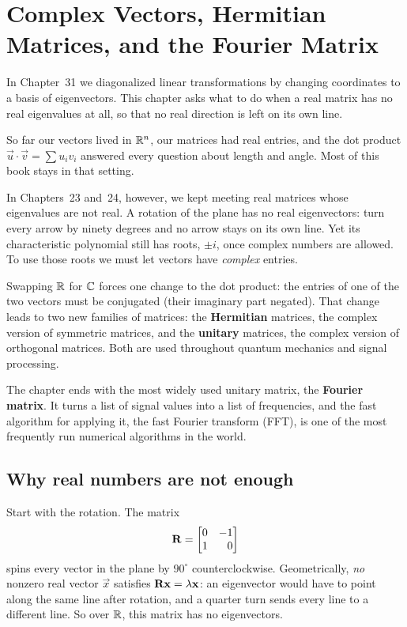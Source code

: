 \chapter{Complex Vectors, Hermitian Matrices, and the Fourier Matrix}

In Chapter~31 we diagonalized linear transformations by changing coordinates to a
basis of eigenvectors. This chapter asks what to do when a real matrix has no real
eigenvalues at all, so that no real direction is left on its own line.

So far our vectors lived in $\mathbb{R}^n$, our matrices had real entries, and the dot
product $\vec u\cdot\vec v=\sum u_iv_i$ answered every question about length and
angle. Most of this book stays in that setting.

In Chapters~23 and~24, however, we kept meeting real matrices whose eigenvalues
are not real. A rotation of the plane has no real eigenvectors: turn every arrow
by ninety degrees and no arrow stays on its own line. Yet its characteristic
polynomial still has roots, $\pm i$, once complex numbers are allowed. To use
those roots we must let vectors have \emph{complex} entries.

Swapping $\mathbb{R}$ for $\mathbb{C}$ forces one change to the dot product: the entries of one of
the two vectors must be conjugated (their imaginary part negated). That change leads to two new families of
matrices: the \textbf{Hermitian} matrices, the complex version of symmetric
matrices, and the \textbf{unitary} matrices, the complex version of orthogonal
matrices. Both are used throughout quantum mechanics and signal processing.

The chapter ends with the most widely used unitary matrix, the \textbf{Fourier
matrix}. It turns a list of signal values into a list of frequencies, and the fast
algorithm for applying it, the fast Fourier transform (FFT), is one of the most
frequently run numerical algorithms in the world.



\chapterline

\section{Why real numbers are not enough}

Start with the rotation. The matrix
\[
  \mathbf{R} = \begin{bmatrix}0 & -1 \\ 1 & \phantom{-}0\end{bmatrix}
\]
spins every vector in the plane by $90^\circ$ counterclockwise. Geometrically,
\emph{no} nonzero real vector $\vec x$ satisfies $\mathbf{R}\mathbf{x} =
\lambda\mathbf{x}$: an eigenvector would have to point along the same line after
rotation, and a quarter turn sends every line to a different line. So over $\mathbb{R}$,
this matrix has no eigenvectors.


